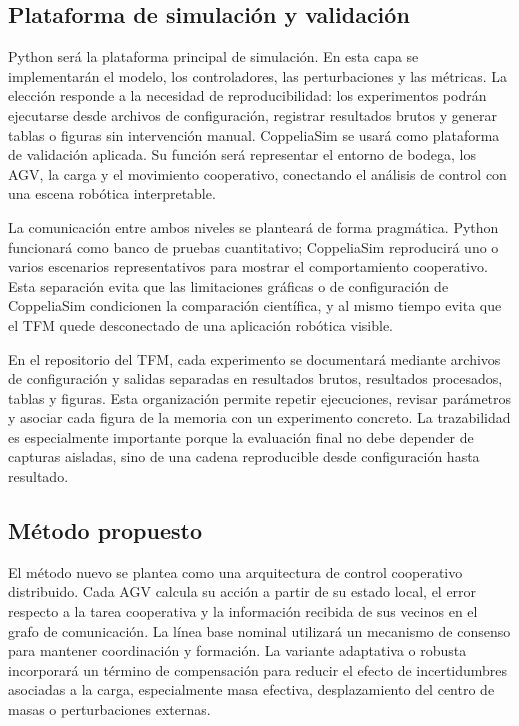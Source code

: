\documentclass[12pt,a4paper]{article}
\begin{document}
\subsection{Plataforma de simulación y validación}

Python será la plataforma principal de simulación. En esta capa se implementarán el modelo, los controladores, las perturbaciones y las métricas. La elección responde a la necesidad de reproducibilidad: los experimentos podrán ejecutarse desde archivos de configuración, registrar resultados brutos y generar tablas o figuras sin intervención manual. CoppeliaSim se usará como plataforma de validación aplicada. Su función será representar el entorno de bodega, los AGV, la carga y el movimiento cooperativo, conectando el análisis de control con una escena robótica interpretable.

La comunicación entre ambos niveles se planteará de forma pragmática. Python funcionará como banco de pruebas cuantitativo; CoppeliaSim reproducirá uno o varios escenarios representativos para mostrar el comportamiento cooperativo. Esta separación evita que las limitaciones gráficas o de configuración de CoppeliaSim condicionen la comparación científica, y al mismo tiempo evita que el TFM quede desconectado de una aplicación robótica visible.

En el repositorio del TFM, cada experimento se documentará mediante archivos de configuración y salidas separadas en resultados brutos, resultados procesados, tablas y figuras. Esta organización permite repetir ejecuciones, revisar parámetros y asociar cada figura de la memoria con un experimento concreto. La trazabilidad es especialmente importante porque la evaluación final no debe depender de capturas aisladas, sino de una cadena reproducible desde configuración hasta resultado.

\subsection{Método propuesto}

El método nuevo se plantea como una arquitectura de control cooperativo distribuido. Cada AGV calcula su acción a partir de su estado local, el error respecto a la tarea cooperativa y la información recibida de sus vecinos en el grafo de comunicación. La línea base nominal utilizará un mecanismo de consenso para mantener coordinación y formación. La variante adaptativa o robusta incorporará un término de compensación para reducir el efecto de incertidumbres asociadas a la carga, especialmente masa efectiva, desplazamiento del centro de masas o perturbaciones externas.
\end{document}
